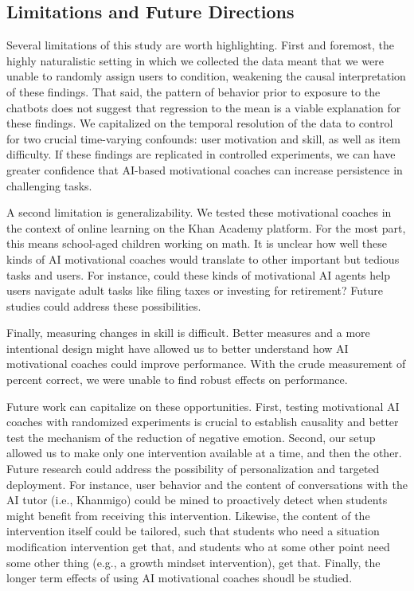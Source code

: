 \documentclass[11pt]{report}
\begin{document}
\begin{mainf}

\subsection*{Limitations and Future Directions}

Several limitations of this study are worth highlighting. 
First and foremost, the highly naturalistic setting in which we collected the data meant that we were unable to randomly assign users to condition, weakening the causal interpretation of these findings.
That said, the pattern of behavior prior to exposure to the chatbots does not suggest that regression to the mean is a viable explanation for these findings.
We capitalized on the temporal resolution of the data to control for two crucial time-varying confounds: user motivation and skill, as well as item difficulty.
If these findings are replicated in controlled experiments, we can have greater confidence that AI-based motivational coaches can increase persistence in challenging tasks.

A second limitation is generalizability.
We tested these motivational coaches in the context of online learning on the Khan Academy platform.
For the most part, this means school-aged children working on math.
It is unclear how well these kinds of AI motivational coaches would translate to other important but tedious tasks and users.
For instance, could these kinds of motivational AI agents help users navigate adult tasks like filing taxes or investing for retirement?
Future studies could address these possibilities.

Finally, measuring changes in skill is difficult.
Better measures and a more intentional design might have allowed us to better understand how AI motivational coaches could improve performance.
With the crude measurement of percent correct, we were unable to find robust effects on performance.

Future work can capitalize on these opportunities. 
First, testing motivational AI coaches with randomized experiments is crucial to establish causality and better test the mechanism of the reduction of negative emotion.
Second, our setup allowed us to make only one intervention available at a time, and then the other. 
Future research could address the possibility of personalization and targeted deployment.
For instance, user behavior and the content of conversations with the AI tutor (i.e., Khanmigo) could be mined to proactively detect when students might benefit from receiving this intervention.
Likewise, the content of the intervention itself could be tailored, such that students who need a situation modification intervention get that, and students who at some other point need some other thing (e.g., a growth mindset intervention), get that.
Finally, the longer term effects of using AI motivational coaches shoudl be studied.


\end{mainf}
\end{document}
